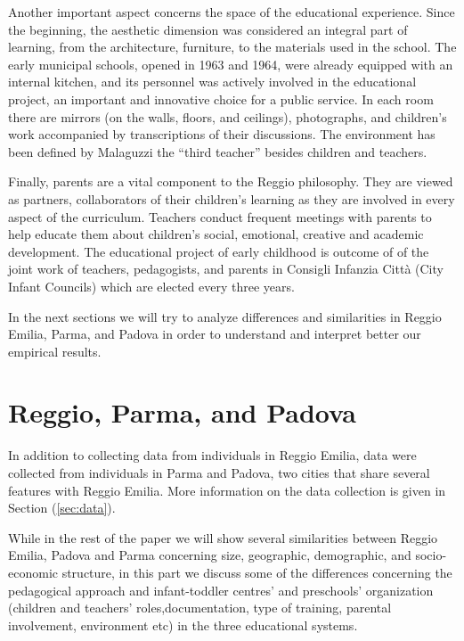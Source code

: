 \documentclass[12pt]{article}
\begin{document}
Another important aspect concerns the space of the educational experience. Since the beginning, the aesthetic dimension was considered an integral part of learning, from the architecture, furniture, to the materials used in the school. The early municipal schools, opened in 1963 and 1964, were already equipped with an internal kitchen, and its personnel was actively involved in the educational project, an important and innovative choice for a public service. In each room there are mirrors (on the walls, floors, and ceilings), photographs, and children's work accompanied by transcriptions of their discussions. The environment has been defined by Malaguzzi the ``third teacher'' besides children and teachers.

Finally, parents are a vital component to the Reggio philosophy. They are viewed as partners, collaborators of their children's learning as they are involved in every aspect of the curriculum. Teachers conduct frequent meetings with parents to help educate them about children's social, emotional, creative and academic development. The educational project of early childhood is outcome of of the joint work of teachers, pedagogists, and parents in Consigli Infanzia Citt\`{a} (City Infant Councils) which are elected every three years.

In the next sections we will try to analyze differences and similarities in Reggio Emilia, Parma, and Padova in order to understand and interpret better our empirical results.

\section{Reggio, Parma, and Padova} \label{sec:ParmaPadova}

In addition to collecting data from individuals in Reggio Emilia, data were collected from individuals in Parma and Padova, two cities that share several features with Reggio Emilia. %
More information on the data collection is given in Section (\ref{sec:data}).

While in the rest of the paper we will show several similarities between Reggio Emilia, Padova and Parma concerning size, geographic, demographic, and socio-economic structure, in this part we discuss some of the differences concerning the pedagogical approach and infant-toddler centres' and preschools' organization (children and teachers' roles,documentation, type of training, parental involvement, environment etc) in the three educational systems.
\end{document}
